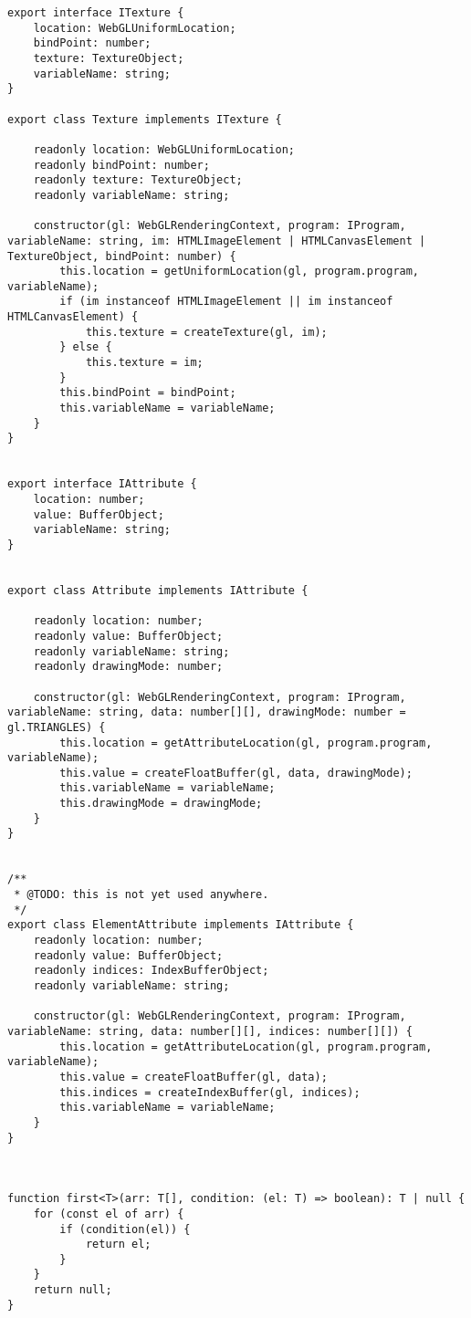 {\begin{lstlisting}
export interface ITexture {
    location: WebGLUniformLocation;
    bindPoint: number;
    texture: TextureObject;
    variableName: string;
}

export class Texture implements ITexture {

    readonly location: WebGLUniformLocation;
    readonly bindPoint: number;
    readonly texture: TextureObject;
    readonly variableName: string;

    constructor(gl: WebGLRenderingContext, program: IProgram, variableName: string, im: HTMLImageElement | HTMLCanvasElement | TextureObject, bindPoint: number) {
        this.location = getUniformLocation(gl, program.program, variableName);
        if (im instanceof HTMLImageElement || im instanceof  HTMLCanvasElement) {
            this.texture = createTexture(gl, im);
        } else {
            this.texture = im;
        }
        this.bindPoint = bindPoint;
        this.variableName = variableName;
    }
}


export interface IAttribute {
    location: number;
    value: BufferObject;
    variableName: string;
}


export class Attribute implements IAttribute {

    readonly location: number;
    readonly value: BufferObject;
    readonly variableName: string;
    readonly drawingMode: number;

    constructor(gl: WebGLRenderingContext, program: IProgram, variableName: string, data: number[][], drawingMode: number = gl.TRIANGLES) {
        this.location = getAttributeLocation(gl, program.program, variableName);
        this.value = createFloatBuffer(gl, data, drawingMode);
        this.variableName = variableName;
        this.drawingMode = drawingMode;
    }
}


/**
 * @TODO: this is not yet used anywhere.
 */
export class ElementAttribute implements IAttribute {
    readonly location: number;
    readonly value: BufferObject;
    readonly indices: IndexBufferObject;
    readonly variableName: string;

    constructor(gl: WebGLRenderingContext, program: IProgram, variableName: string, data: number[][], indices: number[][]) {
        this.location = getAttributeLocation(gl, program.program, variableName);
        this.value = createFloatBuffer(gl, data);
        this.indices = createIndexBuffer(gl, indices);
        this.variableName = variableName;
    }
}



function first<T>(arr: T[], condition: (el: T) => boolean): T | null {
    for (const el of arr) {
        if (condition(el)) {
            return el;
        }
    }
    return null;
}



\end{lstlisting}}
